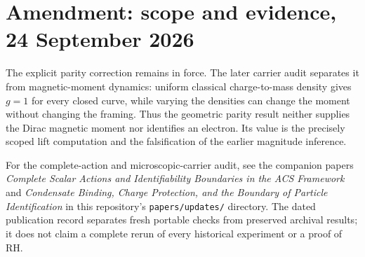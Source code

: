 \documentclass[11pt,a4paper]{article}
\begin{document}
\section*{Amendment: scope and evidence, 24 September 2026}
The explicit parity correction remains in force. The later carrier audit separates it from magnetic-moment dynamics: uniform classical charge-to-mass density gives $g=1$ for every closed curve, while varying the densities can change the moment without changing the framing. Thus the geometric parity result neither supplies the Dirac magnetic moment nor identifies an electron. Its value is the precisely scoped lift computation and the falsification of the earlier magnitude inference.

For the complete-action and microscopic-carrier audit, see the companion
papers \emph{Complete Scalar Actions and Identifiability Boundaries in the ACS
Framework} and \emph{Condensate Binding, Charge Protection, and the Boundary
of Particle Identification} in this repository's \texttt{papers/updates/}
directory. The dated publication record separates fresh portable checks
from preserved archival results; it does not claim a complete rerun of every
historical experiment or a proof of RH.
\end{document}
